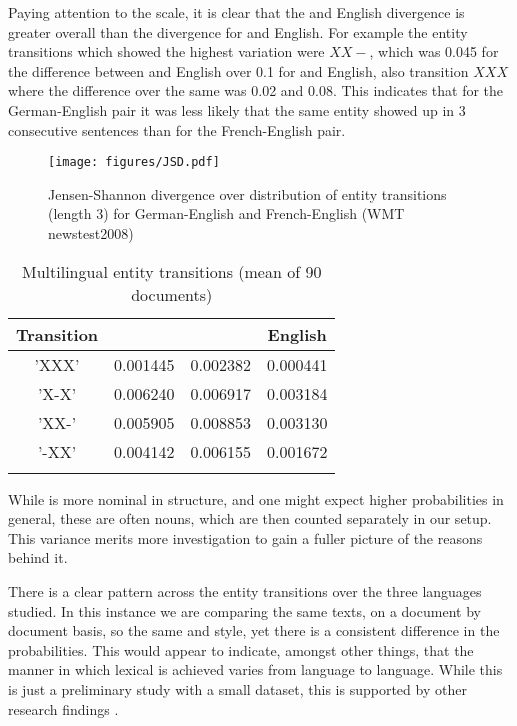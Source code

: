 \documentclass[output=paper]{langsci/langscibook.cls}
\begin{document}
Paying attention to the scale, it is clear that the  and English divergence is greater overall than the divergence for  and English. For example the entity transitions which showed the highest variation were $XX-$, which was 0.045 for the difference between  and English over 0.1 for  and English, also transition $XXX$ where the difference over the same was 0.02 and 0.08. This indicates that for the German-English pair it was less likely that the same entity showed up in 3 consecutive sentences than for the French-English pair.
	
\begin{figure}
\texttt{[image: figures/JSD.pdf]}
	\caption{Jensen-Shannon divergence over distribution of entity transitions (length 3) for German-English and French-English (WMT news\-test2008)}\label{fig:FrEnDeJSD}
\end{figure}

\begin{table}
	 
	
		\begin{tabular}{cccc}
			\lsptoprule
			\bf Transition & \bf \isi{German} & \bf \isi{French} & \bf English  \\  
			\midrule
			'XXX' & 0.001445 &	0.002382 & 0.000441 \\
			'X-X' &  0.006240 & 0.006917 & 0.003184 \\
			'XX-' & 0.005905 &  0.008853 & 0.003130 \\
			'-XX' & 0.004142 & 0.006155 & 0.001672 \\
			\lspbottomrule
		\end{tabular}
	
	\caption{\label{table:multi}Multilingual entity transitions (mean of 90 documents) }
\end{table}

While  is more nominal in structure, and one might expect higher  probabilities in general, these are often  nouns, which are then counted separately in our setup. This variance merits more investigation to gain a fuller picture of the reasons behind it.

There is a clear pattern across the entity transitions over the three languages studied. 
In this instance we are comparing the same texts, on a document by document basis, so the same  and style, yet there is a consistent difference in the probabilities. This would appear to indicate, amongst other things, that the manner in which lexical  is achieved varies from language to language. While this is just a preliminary study with a small dataset, this is supported by other research findings \citep{lapshinova2015variation}.
\end{document}

